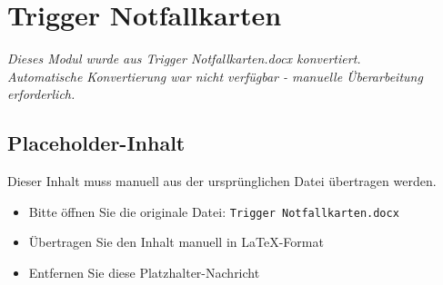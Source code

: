 
\section{Trigger Notfallkarten}
\label{sec:trigger-notfallkarten}

\begin{center}
\textit{Dieses Modul wurde aus Trigger Notfallkarten.docx konvertiert.\\
Automatische Konvertierung war nicht verfügbar - manuelle Überarbeitung erforderlich.}
\end{center}


\subsection{Placeholder-Inhalt}

Dieser Inhalt muss manuell aus der ursprünglichen Datei übertragen werden.

\begin{itemize}
\item Bitte öffnen Sie die originale Datei: \texttt{Trigger Notfallkarten.docx}
\item Übertragen Sie den Inhalt manuell in LaTeX-Format
\item Entfernen Sie diese Platzhalter-Nachricht
\end{itemize}
